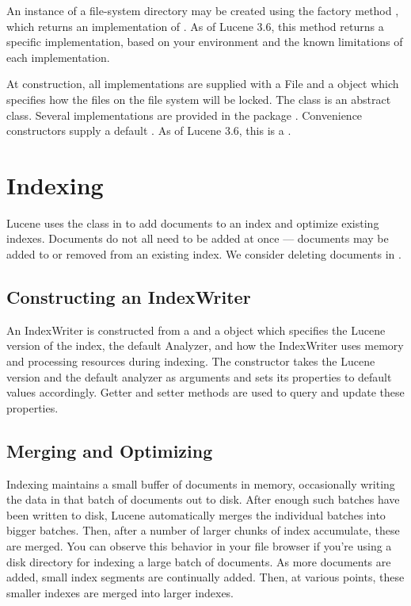 An instance of a file-system directory may be created using the
factory method , which returns an
implementation of .
As of Lucene 3.6, this method returns a specific 
 implementation,
based on your environment and the
known limitations of each implementation.

At construction, all  implementations are 
supplied with a File and a  object which
specifies how the files on the file system will be locked.
The  class is an abstract class.
Several implementations are provided in the package
.
Convenience constructors supply a default .
As of Lucene 3.6, this is a
.


\section{Indexing}

Lucene uses the  class in
 to add documents to an index and
optimize existing indexes.  Documents do not all need to be added at
once --- documents may be added to or removed from an existing index.
We consider deleting documents in .

\subsection{Constructing an IndexWriter}

An IndexWriter is constructed from a  and
a  object which specifies the Lucene version
of the index, the default Analyzer, and how the IndexWriter uses
memory and processing resources during indexing.  The
 constructor takes the Lucene version and the
default analyzer as arguments and sets its properties to default
values accordingly.  Getter and setter methods are used to query and
update these properties.

\subsection{Merging and Optimizing}

Indexing maintains a small buffer of documents in memory,
occasionally writing the data in that batch of documents out to disk.
After enough such batches have been written to disk, Lucene
automatically merges the individual batches into bigger batches.
Then, after a number of larger chunks of index accumulate, these are
merged.  You can observe this behavior in your file browser if you're
using a disk directory for indexing a large batch of documents.  As
more documents are added, small index segments are continually added.
Then, at various points, these smaller indexes are merged into larger
indexes.

